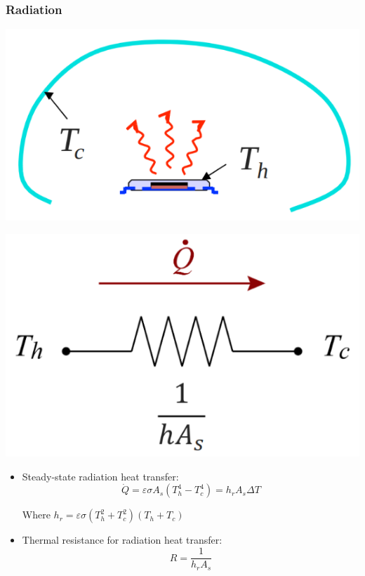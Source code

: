 \documentclass[11pt]{article}
\begin{document}
\subsubsection{Radiation}
\label{sec:orga1a0ad4}
\begin{center}
\includegraphics[scale=1]{./images/thermal-resistance-radiation.png}
\end{center}
\begin{center}
\includegraphics[scale=1]{./images/thermal-resistance-radiation-electrical-analogy.png}
\end{center}
\begin{itemize}
\item Steady-state radiation heat transfer:
\[\dot{Q} = \varepsilon \sigma A_s (T_h^4 - T_c^4) = h_r A_s \Delta T\]

Where \(h_r = \varepsilon \sigma (T_h^2 + T_c^2)(T_h + T_c)\)
\item Thermal resistance for radiation heat transfer:
\[R = \frac{1}{h_r A_s}\]
\end{itemize}
\end{document}
